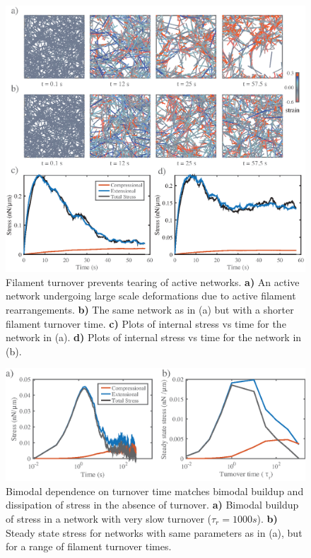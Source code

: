 \documentclass[10pt,letterpaper]{article}
\begin{document}
\begin{figure}[h!]
\centering
\includegraphics[width=\hsize]{figures/figureS5}
\caption{\label{fig:active_tear}  Filament turnover prevents tearing of active networks.  \textbf{a)}  An active network undergoing large scale deformations due to active filament rearrangements.  \textbf{b)}  The same network as in (a) but with a shorter filament turnover time.  \textbf{c)}  Plots of internal stress vs time for the network in (a).  \textbf{d)}  Plots of internal stress vs time for the network in (b).  }
\end{figure}

\begin{figure}[h!]
\centering
\includegraphics[width=\hsize]{figures/figureS6}
\caption{\label{fig:recycle_supp}  Bimodal dependence on turnover time matches bimodal buildup and dissipation of stress in the absence of turnover.  \textbf{a)}  Bimodal buildup of stress in a network with very slow turnover ($\tau_r = 1000s$).  \textbf{b)}  Steady state stress for networks with same parameters as in (a), but  for a range of filament turnover times.   }
\end{figure}
\end{document}
